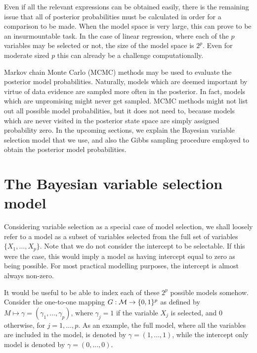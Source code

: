 \documentclass[a4paper,showframe,11pt]{report}
\begin{document}
Even if all the relevant expressions can be obtained easily, there is the remaining issue that all of posterior probabilities must be calculated in order for a comparison to be made.
When the model space is very large, this can prove to be an insurmountable task.
In the case of linear regression, where each of the $p$ variables may be selected or not, the size of the model space is $2^p$.
Even for moderate sized $p$ this can already be a challenge computationally.

Markov chain Monte Carlo (MCMC) methods may be used to evaluate the posterior model probabilities.
Naturally, models which are deemed important by virtue of data evidence are sampled more often in the posterior.
In fact, models which are unpromising might never get sampled. 
MCMC methods might not list out all possible model probabilities, but it does not need to, because models which are never visited in the posterior state space are simply assigned probability zero.
In the upcoming sections, we explain the Bayesian variable selection model that we use, and also the Gibbs sampling procedure employed to obtain the posterior model probabilities.



\section{The Bayesian variable selection model}

Considering variable selection as a special case of model selection, we shall loosely refer to a model as a subset of variables selected from the full set of variables $\{ X_1, \dots, X_p \}$. 
Note that we do not consider the intercept to be selectable. 
If this were the case, this would imply a model as having intercept equal to zero as being possible. 
For most practical modelling purposes, the intercept is almost always non-zero.

It would be useful to be able to index each of these $2^p$ possible models somehow. 
Consider the one-to-one mapping $G:{\mathcal M} \to \{0,1\}^p$ as defined by $M \mapsto \gamma = (\gamma_1,\dots,\gamma_p)$, where $\gamma_j = 1$ if the variable $X_j$ is selected, and 0 otherwise, for $j=1,\dots,p$.
As an example, the full model, where all the variables are included in the model, is denoted by $\gamma = (1, \dots, 1)$, while the intercept only model is denoted by $\gamma = (0, \dots, 0)$.
\end{document}
